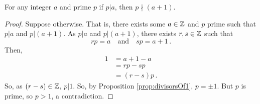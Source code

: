 \guard





\begin{prop}
\label{prop:consecutiveIntegersNotDivisibleBySamePrime}
  For any integer $a$ and prime $p$ if $p|a$, then $p\nmid(a+1)$.
\end{prop}
\begin{proof}
  Suppose otherwise.
  That is, there exists some $a\in\mathbb{Z}$ and $p$ prime such that $p|a$ and $p|(a+1)$.
  As $p|a$ and $p|(a+1)$, there exists $r,s\in\mathbb{Z}$ such that \[ rp=a\quad\text{and}\quad sp=a+1\,.\]
  Then,
  \begin{align*}
    1 &=  a+1 - a \\
      &= rp - sp \\
      &= (r-s)p \,.
  \end{align*}
  So, as $(r-s)\in\mathbb{Z}$, $p|1$.
  So, by Proposition \ref{prop:divisorsOf1}, $p=\pm 1$.
  But $p$ is prime, so $p>1$, a contradiction.
\end{proof}
